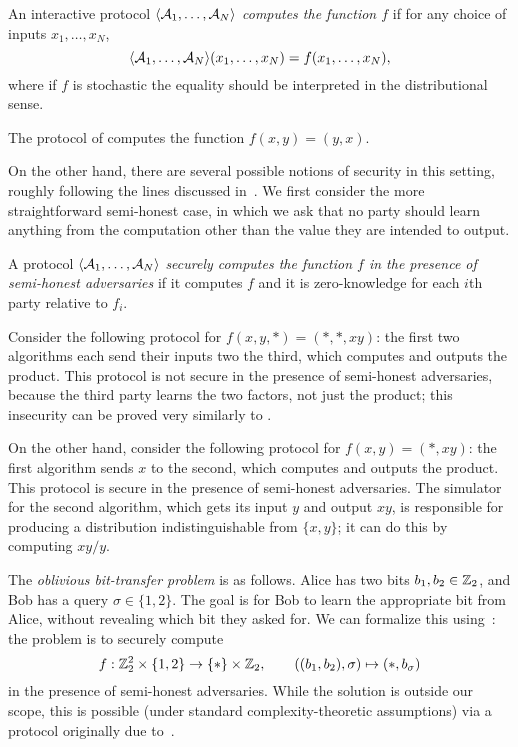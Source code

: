 \begin{dfn}
An interactive protocol $\langle\mathcal{A}_1,\dots,\mathcal{A}_N\rangle$ \emph{computes the function $f$}
if for any choice of inputs $x_1,\dots,x_N$, \[ \langle\mathcal{A}_1, \dots,
  \mathcal{A}_N\rangle(x_1,\dots,x_N) = f(x_1,\dots,x_N),
\] where if $f$ is stochastic the equality should be interpreted in the
distributional sense.
\end{dfn}

\begin{ex}
  The protocol of  computes the function $f(x,y) = (y,x)$.
\end{ex}

On the other hand, there are several possible notions of security in this
setting, roughly following the lines discussed
in~.
We first consider the more straightforward semi-honest case, in which we ask
that no party should learn anything from the computation other than the value
they are intended to output.

\begin{dfn}\label{def:semi-honest-secure}
  A protocol $\langle\mathcal{A}_1,\dots,\mathcal{A}_N\rangle$ \emph{securely computes the function $f$ in
  the presence of semi-honest adversaries} if it computes $f$ and it is
  zero-knowledge for each $i$th party relative to $f_i$.
\end{dfn}

\begin{ex}
  Consider the following protocol for $f(x, y, *) = (*, *, xy)$: the first two
  algorithms each send their inputs two the third, which computes and outputs the
  product. This protocol is not secure in the presence of semi-honest
  adversaries, because the third party learns the two factors, not just the
  product; this insecurity can be proved very similarly to
  .

  On the other hand, consider the following protocol for $f(x, y) = (*, xy)$:
  the first algorithm sends $x$ to the second, which computes and outputs the
  product. This protocol is secure in the presence of semi-honest adversaries.
  The simulator for the second algorithm, which gets its input $y$ and output
  $xy$, is responsible for producing a distribution indistinguishable from $\{x,
  y\}$; it can do this by computing $xy / y$.
\end{ex}

\begin{ex}
  The \emph{oblivious bit-transfer problem} is as follows. Alice has two
  bits $b_1,b_2\in\mathbb{Z}_2$, and Bob has a query $\sigma\in\{1,2\}$.
  The goal is for Bob to learn the appropriate bit from Alice,
  without revealing which bit they asked for. We can formalize this
  using~: the problem is to securely
  compute \[
    f: \mathbb{Z}_2^2\times \{1,2\}\to \{*\}\times\mathbb{Z}_2,\quad\quad ((b_1,b_2), \sigma) \mapsto (*, b_\sigma)
  \]in the presence of semi-honest adversaries. While the solution is outside
  our scope, this is possible (under standard complexity-theoretic assumptions)
  via a protocol originally due to~\cite{even-et-al-1985}.
\end{ex}

